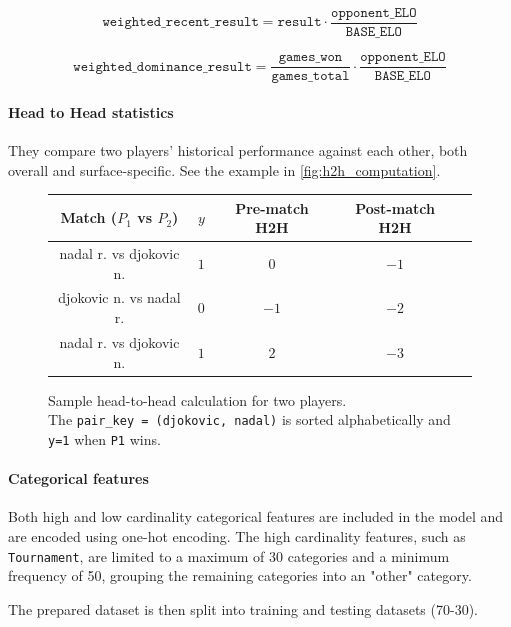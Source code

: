 \begin{equation*}
    \texttt{weighted\_recent\_result} = \texttt{result} \cdot \frac{\texttt{opponent\_ELO}}{\texttt{BASE\_ELO}}
\end{equation*}

\begin{equation*}
    \texttt{weighted\_dominance\_result} = \frac{\texttt{games\_won}}{\texttt{games\_total}} \cdot \frac{\texttt{opponent\_ELO}}{\texttt{BASE\_ELO}}
\end{equation*}

\pagebreak

\paragraph{Head to Head statistics} They compare two players' historical performance against each other, both overall and surface-specific. 
See the example in \autoref{fig:h2h_computation}.

\begin{figure}[ht]
    \centering
    \normalsize
    \renewcommand{\arraystretch}{1}
    \begin{tabular}{ccccc}
        \hline
        Match ($P_1$ vs $P_2$) & $y$ & Pre-match H2H & Post-match H2H \\
        \hline
        nadal r. vs djokovic n. & $1$ & $0$ & $-1$ \\
        djokovic n. vs nadal r. & $0$ & $-1$ & $-2$ \\
        nadal r. vs djokovic n. & $1$ & $2$ & $-3$ \\
        \hline
    \end{tabular}
    \caption{Sample head-to-head calculation for two players. \\ The \texttt{pair\_key = (djokovic, nadal)} is sorted alphabetically and \texttt{y=1} when \texttt{P1} wins.}
    \label{fig:h2h_computation}
\end{figure}

\paragraph{Categorical features} Both high and low cardinality categorical features are included in the model and are encoded using one-hot encoding.
The high cardinality features, such as \texttt{Tournament}, are limited to a maximum of 30 categories and a minimum frequency of 50, grouping the remaining categories into an "other" category.

The prepared dataset is then split into training and testing datasets (70-30).

